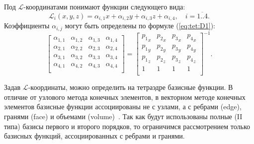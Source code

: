 \documentclass[a4paper,14pt]{article}
\begin{document}
\noindent Под $\mathcal{L}$-координатами понимают функции следующего вида:
\begin{equation*}
	\mathcal{L}_i (x, y, z) = \alpha_{i, 1} x + \alpha_{i, 2} y + \alpha_{i, 3} z + \alpha_{i, 4} , \text{~~~} i = \overline{1..4} . \label{eq:tet:L}
\end{equation*}
Коэффициенты $\alpha_{i, j}$ могут быть определены по формуле (\ref{eq:tet:D1}):
\begin{equation}
	\left[
	\begin{matrix}
		\alpha_{1, 1} & \alpha_{1, 2} & \alpha_{1, 3} & \alpha_{1, 4} \\
		\alpha_{2, 1} & \alpha_{2, 2} & \alpha_{2, 3} & \alpha_{2, 4} \\
		\alpha_{3, 1} & \alpha_{3, 2} & \alpha_{3, 3} & \alpha_{3, 4} \\
		\alpha_{4, 1} & \alpha_{4, 2} & \alpha_{4, 3} & \alpha_{4, 4} \\
	\end{matrix}
	\right] = \left[
	\begin{matrix}
		{p_1}_x & {p_2}_x & {p_3}_x & {p_4}_x \\
		{p_1}_y & {p_2}_y & {p_3}_y & {p_4}_y \\
		{p_1}_z & {p_2}_z & {p_3}_z & {p_4}_z \\
		1 & 1 & 1 & 1 \\
	\end{matrix}
	\right]^{-1} . \label{eq:tet:D1}
\end{equation}

Задав $\mathcal{L}$-координаты, можно определить на тетраэдре базисные функции. В отличие от узлового метода конечных элементов, в векторном методе конечных элементов базисные функции ассоциированы не с узлами, а с ребрами (edge), гранями (face) и объемами (volume)~\citep{nechaev, webb1999}. Так как будут использованы полные (II типа) базисы первого и второго порядков, то ограничимся рассмотрением только базисных функций, ассоциированных с ребрами и гранями.
\end{document}
